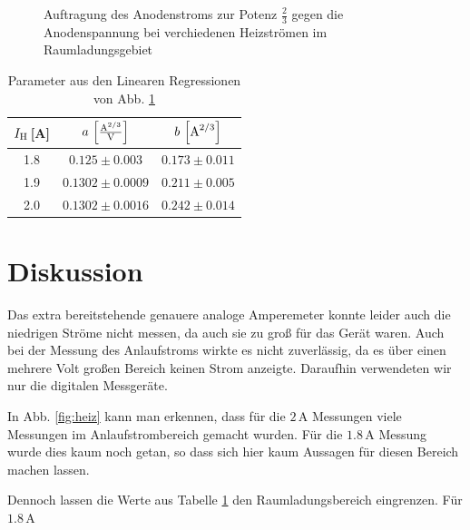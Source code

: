 \documentclass[12pt,a4paper,titlepage,headinclude,bibtotoc]{scrartcl}
\begin{document}
\begin{figure}[h]
   \centering
   \hfill
   \hfill
   \caption{Auftragung des Anodenstroms zur Potenz $\frac{2}{3}$ gegen die Anodenspannung bei verchiedenen Heizströmen im Raumladungsgebiet}
   \label{fig:raumladung}
 \end{figure}

\begin{table}[!h]
\centering
\begin{tabular}{|c|c|c|}
\hline
$I_\text H\,$[A]& $a\,\left[\frac{\text A^{2/3}}{\text V}\right]$	& $b\,\left[\text A^{2/3}\right]$			\\\hline\hline
1.8 		& $0.125\pm 0.003$	& $0.173\pm 0.011$	\\\hline
1.9 		& $0.1302\pm0.0009$ 	& $0.211\pm 0.005$	\\\hline
2.0 		& $0.1302\pm 0.0016$	& $0.242 \pm 0.014$	\\\hline
\end{tabular}
\caption{Parameter aus den Linearen Regressionen von Abb. \ref{fig:raumladung}}
\label{tab:ParaRaum}
\end{table}
\section{Diskussion}
\label{sec:diskussion}
Das extra bereitstehende genauere analoge Amperemeter konnte leider auch die niedrigen Ströme nicht messen, da auch sie zu groß für das Gerät waren.
Auch bei der Messung des Anlaufstroms wirkte es nicht zuverlässig, da es über einen mehrere Volt großen Bereich keinen Strom anzeigte.
Daraufhin verwendeten wir nur die digitalen Messgeräte.

In Abb. \ref{fig:heiz} kann man erkennen, dass für die $2\,$A Messungen viele Messungen im Anlaufstrombereich gemacht wurden.
Für die $1.8\,$A Messung wurde dies kaum noch getan, so dass sich hier kaum Aussagen für diesen Bereich machen lassen.

Dennoch lassen die Werte aus Tabelle \ref{tab:ParaRaum} den Raumladungsbereich eingrenzen.
Für $1.8\,$A 



\end{document}
